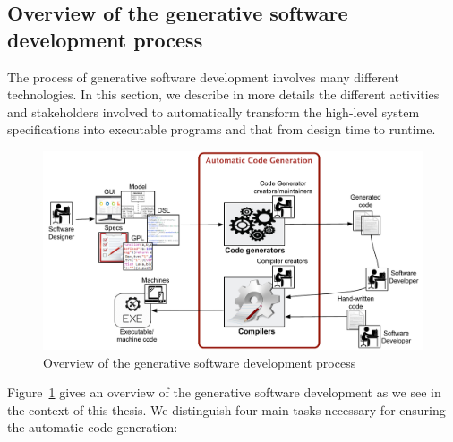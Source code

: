 

\subsection{Overview of the generative software development process}
The process of generative software development involves many different technologies. In this section, we describe in more details the different activities and stakeholders involved to automatically transform the high-level system specifications into executable programs and that from design time to runtime.
\begin{figure}[h]
	\center
	\includegraphics[scale=0.65]{Background/fig/background_overview2.pdf}
	\caption{Overview of the generative software development process}
	\label{fig:background_overview2}
\end{figure}
Figure~\ref{fig:background_overview2} gives an overview of the generative software development as we see in the context of this thesis. We distinguish four main tasks necessary for ensuring the automatic code generation: 


